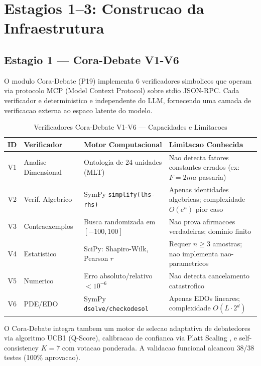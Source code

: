 \documentclass[5p]{elsarticle}
\begin{document}
\section{Estagios 1--3: Construcao da Infraestrutura}

\subsection{Estagio 1 — Cora-Debate V1-V6}

O modulo Cora-Debate (P19) implementa 6 verificadores simbolicos que operam
via protocolo MCP (Model Context Protocol) sobre stdio JSON-RPC. Cada verificador
e deterministico e independente do LLM, fornecendo uma camada de verificacao
externa ao espaco latente do modelo.

\begin{table}[H]
  \centering
  \caption{Verificadores Cora-Debate V1-V6 — Capacidades e Limitacoes}
  \label{tab:v1v6}
  \small
  \begin{tabular}{clp{3.5cm}p{4.5cm}}
    \toprule
    \textbf{ID} & \textbf{Verificador} & \textbf{Motor Computacional} & \textbf{Limitacao Conhecida} \\
    \midrule
    V1 & Analise Dimensional & Ontologia de 24 unidades (MLT) & Nao detecta fatores constantes errados (ex: $F=2ma$ passaria) \\
    V2 & Verif. Algebrico & SymPy \texttt{simplify(lhs-rhs)} & Apenas identidades algebricas; complexidade $O(e^n)$ pior caso \\
    V3 & Contraexemplos & Busca randomizada em $[-100,100]$ & Nao prova afirmacoes verdadeiras; dominio finito \\
    V4 & Estatistico & SciPy: Shapiro-Wilk, Pearson $r$ & Requer $n\geq 3$ amostras; nao implementa nao-parametricos \\
    V5 & Numerico & Erro absoluto/relativo $<10^{-6}$ & Nao detecta cancelamento catastrofico \\
    V6 & PDE/EDO & SymPy \texttt{dsolve/checkodesol} & Apenas EDOs lineares; complexidade $O(L\cdot 2^d)$ \\
    \bottomrule
  \end{tabular}
\end{table}

O Cora-Debate integra tambem um motor de selecao adaptativa de debatedores
via algoritmo UCB1 \cite{auer2002} (Q-Score), calibracao de confianca via
Platt Scaling \cite{platt1999,guo2017}, e self-consistency $K=7$ com votacao
ponderada. A validacao funcional alcancou 38/38 testes (100\% aprovacao).
\end{document}
